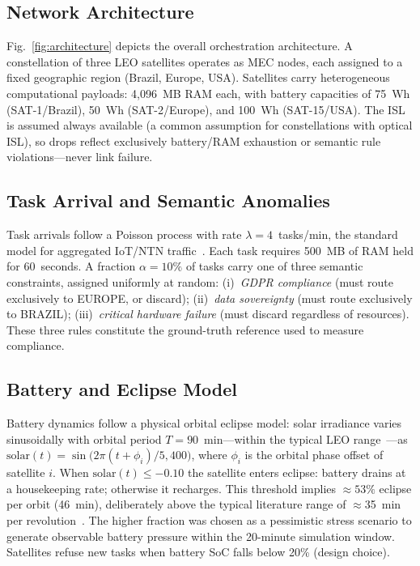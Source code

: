 \documentclass[conference,comsoc,twoside,caption=false]{IEEEtran}
\theoremstyle{definition}
\begin{document}
\subsection{Network Architecture}
Fig.~\ref{fig:architecture} depicts the overall orchestration architecture.
A constellation of three \ac{LEO} satellites operates as \ac{MEC} nodes, each
assigned to a fixed geographic region (Brazil, Europe, USA). Satellites carry
heterogeneous computational payloads: 4{,}096~MB RAM each, with battery
capacities of 75~Wh (SAT-1/Brazil), 50~Wh (SAT-2/Europe), and 100~Wh
(SAT-15/USA). The \ac{ISL} is assumed always available (a common assumption for
constellations with optical ISL), so drops reflect exclusively battery/RAM
exhaustion or semantic rule violations---never link failure.

\subsection{Task Arrival and Semantic Anomalies}
Task arrivals follow a Poisson process with rate $\lambda = 4$~tasks/min, the
standard model for aggregated \ac{IoT}/NTN traffic~\cite{guo2024}. Each task
requires 500~MB of RAM held for 60~seconds. A fraction $\alpha = 10\%$ of tasks
carry one of three semantic constraints, assigned uniformly at random:
(i)~\emph{GDPR compliance} (must route exclusively to EUROPE, or discard);
(ii)~\emph{data sovereignty} (must route exclusively to BRAZIL);
(iii)~\emph{critical hardware failure} (must discard regardless of resources).
These three rules constitute the ground-truth reference used to measure
compliance.

\subsection{Battery and Eclipse Model}
Battery dynamics follow a physical orbital eclipse model: solar irradiance
varies sinusoidally with orbital period $T = 90$~min---within the typical LEO
range~\cite{guo2024,gpp2022}---as
$\mathrm{solar}(t) = \sin\!\bigl(2\pi(t+\phi_i)/5{,}400\bigr)$,
where $\phi_i$ is the orbital phase offset of satellite $i$. When
$\mathrm{solar}(t) \le -0.10$ the satellite enters eclipse: battery drains at
a housekeeping rate; otherwise it recharges. This threshold implies
$\approx\!53\%$ eclipse per orbit (46~min), deliberately above the typical
literature range of $\approx$35~min per revolution~\cite{sumanth2019}. The
higher fraction was chosen as a pessimistic stress scenario to generate
observable battery pressure within the 20-minute simulation window. Satellites
refuse new tasks when battery \ac{SoC} falls below 20\% (design choice).
\end{document}
